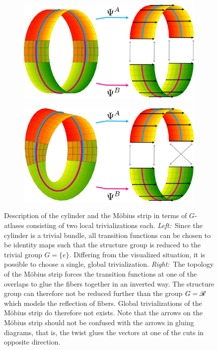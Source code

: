 \begin{figure}
    \centering
    \begin{subfigure}[b]{0.46\textwidth}
        \includegraphics[width=\textwidth]{figures/trivialization_cylinder.png}
    \end{subfigure}
    \hfill
    \begin{subfigure}[b]{0.46\textwidth}
        \centering
        \includegraphics[width=\textwidth]{figures/trivialization_moebius_2.png}
    \end{subfigure}
    \vspace{2.ex}
    \caption{\small
        Description of the cylinder and the M{\"o}bius strip in terms of $G$-atlases consisting of two local trivializations each.
        \textit{Left:}~Since the cylinder is a trivial bundle, all transition functions can be chosen to be identity maps such that the structure group is reduced to the trivial group $G=\{e\}$.
        Differing from the visualized situation, it is possible to choose a single, global trivialization.
        \textit{Right:}~The topology of the M{\"o}bius strip forces the transition functions at one of the overlaps to glue the fibers together in an inverted way.
        The structure group can therefore not be reduced further than the group $G=\mathscr{R}$ which models the reflection of fibers.
        Global trivializations of the M{\"o}bius strip do therefore not exists.
        Note that the arrows on the M{\"o}bius strip should not be confused with the arrows in gluing diagrams, that is, the twist glues the vectors at one of the cuts in opposite direction.
    }
    \label{fig:trivializations_moebius}
\end{figure}

